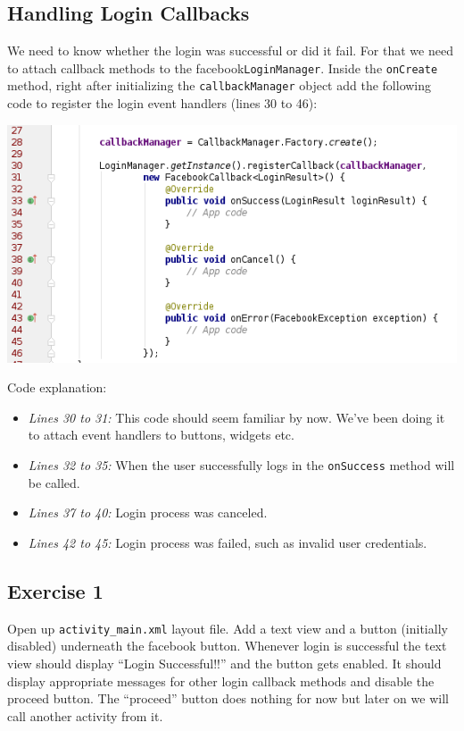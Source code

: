 \subsection{Handling Login Callbacks}
We need to know whether the login was successful or did it fail. For that we need to attach callback methods to the facebook\texttt{LoginManager}. Inside the \texttt{onCreate} method, right after initializing the \texttt{callbackManager} object add the following code to register the login event handlers (lines 30 to 46):

\begin{center}
	\includegraphics[scale=\SourceCodeScale]{chapters/ch12/images/26}
\end{center}

Code explanation:
\begin{itemize}
	\item \textit{Lines 30 to 31:} This code should seem familiar by now. We've been doing it to attach event handlers to buttons, widgets etc. 
	
	\item \textit{Lines 32 to 35:} When the user successfully logs in the \texttt{onSuccess} method will be called.
	
	\item \textit{Lines 37 to 40:} Login process was canceled.
	
	\item \textit{Lines 42 to 45:} Login process was failed, such as invalid user credentials.
	
\end{itemize}

\subsection{Exercise 1}
\label{FBI:exercise1}
Open up \texttt{activity\_main.xml} layout file. Add a text view and a button (initially disabled) underneath the facebook button. Whenever login is successful the text view should display ``Login Successful!!'' and the button gets enabled. It should display appropriate messages for other login callback methods and disable the proceed button. The ``proceed'' button does nothing for now but later on we will call another activity from it.

